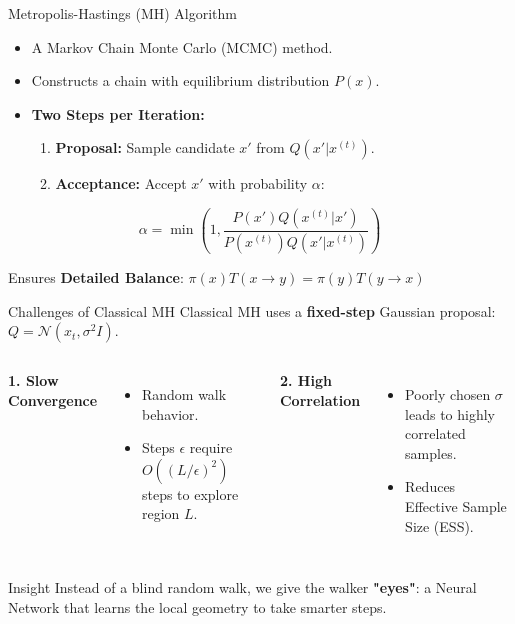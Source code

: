 \documentclass[aspectratio=169]{beamer}
\begin{document}
\begin{frame}{Metropolis-Hastings (MH) Algorithm}
    \begin{itemize}
        \item A Markov Chain Monte Carlo (MCMC) method.
        \item Constructs a chain with equilibrium distribution $P(x)$.
        \item \textbf{Two Steps per Iteration:}
        \begin{enumerate}
            \item \textbf{Proposal:} Sample candidate $x'$ from $Q(x'|x^{(t)})$.
            \item \textbf{Acceptance:} Accept $x'$ with probability $\alpha$:
        \end{enumerate}
    \end{itemize}
    
    \begin{equation*}
        \alpha = \min\left(1, \frac{P(x') Q(x^{(t)}|x')}{P(x^{(t)}) Q(x'|x^{(t)})}\right)
    \end{equation*}
    
    \vspace{0.2cm}
    \footnotesize{Ensures \textbf{Detailed Balance}: $\pi(x)T(x \to y) = \pi(y)T(y \to x)$}
\end{frame}

\begin{frame}{Challenges of Classical MH}
    Classical MH uses a \textbf{fixed-step} Gaussian proposal: $Q = \mathcal{N}(x_t, \sigma^2 I)$.
    
    \vspace{0.3cm}
    
    \begin{columns}
        \textbf{1. Slow Convergence}
        \begin{itemize}
            \item Random walk behavior.
            \item Steps $\epsilon$ require $O((L/\epsilon)^2)$ steps to explore region $L$.
        \end{itemize}
        
        \textbf{2. High Correlation}
        \begin{itemize}
            \item Poorly chosen $\sigma$ leads to highly correlated samples.
            \item Reduces Effective Sample Size (ESS).
        \end{itemize}
    \end{columns}
    
    \vspace{0.5cm}
    \begin{alertblock}{Insight}
        Instead of a blind random walk, we give the walker \textbf{"eyes"}: a Neural Network that learns the local geometry to take smarter steps.
    \end{alertblock}
\end{frame}
\end{document}
